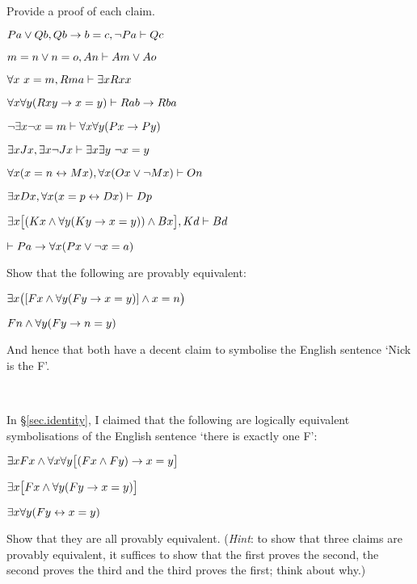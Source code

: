 \practiceproblems
\problempart
\label{pr.identity}
Provide a proof of each claim.
\begin{earg}
\item $Pa \vee Qb, Qb \rightarrow b=c, \neg Pa \vdash Qc$
\item $m=n \vee n=o, An \vdash Am \vee Ao$
\item $\forall x\ x=m, Rma\vdash \exists x Rxx$
\item $\forall x\forall y(Rxy \rightarrow x=y)\vdash Rab \rightarrow Rba$
\item $\neg \exists x\neg x = m \vdash \forall x\forall y (Px \rightarrow Py)$
\item $\exists x Jx, \exists x \neg Jx\vdash \exists x \exists y\ \neg x = y$
\item $\forall x(x=n \leftrightarrow Mx), \forall x(Ox \vee \neg Mx)\vdash On$
\item $\exists x Dx, \forall x(x=p \leftrightarrow Dx)\vdash Dp$
\item $\exists x\bigl[(Kx \wedge \forall y(Ky \rightarrow x=y)) \wedge Bx\bigr], Kd\vdash Bd$
\item $\vdash Pa \rightarrow \forall x(Px \vee \neg x = a)$
\end{earg}

\problempart
Show that the following are provably equivalent:
\begin{ebullet}
\item $\exists x \bigl([Fx \wedge \forall y (Fy \rightarrow x = y)] \wedge x = n\bigr)$
\item $Fn \wedge \forall y (Fy \rightarrow n= y)$
\end{ebullet}
And hence that both have a decent claim to symbolise the English sentence `Nick is the F'.

\

\problempart
In \S\ref{sec.identity}, I claimed that the following are logically equivalent symbolisations of the English sentence `there is exactly one F':
\begin{ebullet}
\item $\exists x Fx \wedge \forall x \forall y \bigl[(Fx \wedge Fy) \rightarrow x = y\bigr]$
\item $\exists x \bigl[Fx \wedge \forall y (Fy \rightarrow x = y)\bigr]$
\item $\exists x \forall y (Fy \leftrightarrow x = y)$
\end{ebullet}
Show that they are all provably equivalent. (\emph{Hint}: to show that three claims are provably equivalent, it suffices to show that the first proves the second, the second proves the third and the third proves the first; think about why.)


